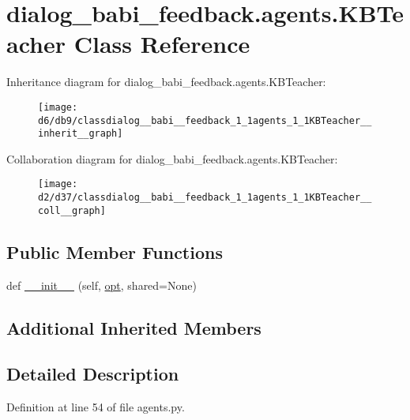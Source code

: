 \hypertarget{classdialog__babi__feedback_1_1agents_1_1KBTeacher}{}\section{dialog\+\_\+babi\+\_\+feedback.\+agents.\+K\+B\+Teacher Class Reference}
\label{classdialog__babi__feedback_1_1agents_1_1KBTeacher}


Inheritance diagram for dialog\+\_\+babi\+\_\+feedback.\+agents.\+K\+B\+Teacher\+:
\nopagebreak
\begin{figure}[H]
\begin{center}
\leavevmode
\texttt{[image: d6/db9/classdialog\_\_babi\_\_feedback\_1\_1agents\_1\_1KBTeacher\_\_inherit\_\_graph]}
\end{center}
\end{figure}


Collaboration diagram for dialog\+\_\+babi\+\_\+feedback.\+agents.\+K\+B\+Teacher\+:
\nopagebreak
\begin{figure}[H]
\begin{center}
\leavevmode
\texttt{[image: d2/d37/classdialog\_\_babi\_\_feedback\_1\_1agents\_1\_1KBTeacher\_\_coll\_\_graph]}
\end{center}
\end{figure}
\subsection*{Public Member Functions}
\begin{DoxyCompactItemize}
\item 
def \hyperlink{classdialog__babi__feedback_1_1agents_1_1KBTeacher_ad160e36b27da1a5a2d8ff563fb899b09}{\+\_\+\+\_\+init\+\_\+\+\_\+} (self, \hyperlink{classparlai_1_1core_1_1teachers_1_1FbDialogTeacher_af7a9ec497b9cd0292d7b8fa220da7c28}{opt}, shared=None)
\end{DoxyCompactItemize}
\subsection*{Additional Inherited Members}


\subsection{Detailed Description}


Definition at line 54 of file agents.\+py.



